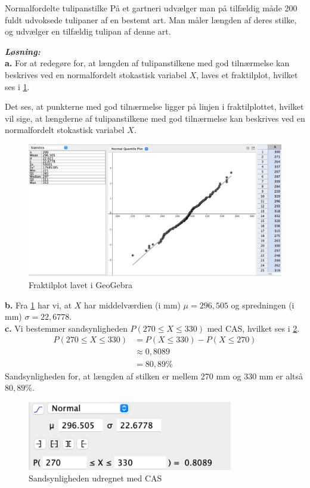 \documentclass{article}
\newcommand{\sol}{\setlength{\parindent}{0cm}\textbf{\textit{Løsning:}}\setlength{\parindent}{1cm}}
\begin{document}
\begin{question}{Normalfordelte tulipanstilke}{}
  På et gartneri udvælger man på tilfældig måde 200 fuldt udvoksede tulipaner af en bestemt art.
  Man måler længden af deres stilke, og udvælger en tilfældig tulipan af denne art.
\end{question}
\sol \\
\textbf{a.}
For at redegøre for, at længden af tulipanstilkene med god tilnærmelse kan beskrives ved en normalfordelt stokastisk variabel $X$, laves et fraktilplot, hvilket ses i \cref{fig:fraktilplot}.

Det ses, at punkterne med god tilnærmelse ligger på linjen i fraktilplottet, hvilket vil sige, at længderne af tulipanstilkene med god tilnærmelse kan beskrives ved en normalfordelt stokastisk variabel $X$.
\begin{figure}[H]
\begin{center}
  \includegraphics[width=\textwidth]{fraktilplot.png}
\end{center}
\caption{Fraktilplot lavet i GeoGebra}
\label{fig:fraktilplot}
\end{figure}
\noindent \textbf{b.}
Fra \cref{fig:fraktilplot} har vi, at $X$ har middelværdien (i mm) $\mu =296,505$ og spredningen (i mm) $\sigma = 22,6778$.\\[1ex]
\textbf{c.}
Vi bestemmer sandsynligheden $P(270 \leq X \leq 330)$ med CAS, hvilket ses i \cref{fig:CASstilke}. 
\begin{equation*}
\begin{split}
  P(270 \leq X \leq 330)&=P(X \leq 330)-P(X \leq 270)\\
  &\approx 0,8089 \\
  &=80,89 \%
\end{split}
\end{equation*}
Sandsynligheden for, at længden af stilken er mellem 270 mm og 330 mm er altså $80,89 \%$.
\begin{figure}[H]
\begin{center}
  \includegraphics[width=0.8\textwidth]{CASstilke.png}
\end{center}
\caption{Sandsynligheden udregnet med CAS}
\label{fig:CASstilke}
\end{figure}
\end{document}
